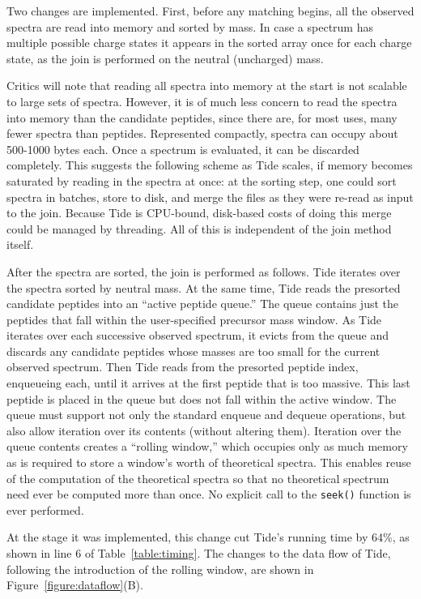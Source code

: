 Two changes are implemented. First, before any matching begins, all
the observed spectra are read into memory and sorted by mass.  In case
a spectrum has multiple possible charge states it appears in the
sorted array once for each charge state, as the join is performed on
the neutral (uncharged) mass.

Critics will note that reading all spectra into memory at the start is
not scalable to large sets of spectra. However, it is of much less
concern to read the spectra into memory than the candidate peptides,
since there are, for most uses, many fewer spectra than
peptides. Represented compactly, spectra can occupy about 500-1000
bytes each. Once a spectrum is evaluated, it can be discarded
completely. This suggests the following scheme as Tide scales, if
memory becomes saturated by reading in the spectra at once: at the
sorting step, one could sort spectra in batches, store to disk, and
merge the files as they were re-read as input to the join. Because Tide
is CPU-bound, disk-based costs of doing this merge could be managed by
threading. All of this is independent of the join method itself.

After the spectra are sorted, the join is performed as follows. Tide
iterates over the spectra sorted by neutral mass. At the same time,
Tide reads the presorted candidate peptides into an ``active peptide
queue.'' The queue contains just the peptides that fall within the
user-specified precursor mass window. As Tide iterates over each
successive observed spectrum, it evicts from the queue and discards
any candidate peptides whose masses are too small for the current observed
spectrum. Then Tide reads from the presorted peptide index, enqueueing
each, until it arrives at the first peptide that is too massive. This
last peptide is placed in the queue but does not fall within the
active window. The queue must support not only the standard enqueue
and dequeue operations, but also allow iteration over its contents
(without altering them). Iteration over the queue contents creates a
``rolling window,'' which occupies only as much memory as is required
to store a window's worth of theoretical spectra. This enables reuse
of the computation of the theoretical spectra so that no theoretical
spectrum need ever be computed more than once. No explicit call to the 
{\tt seek()} function
is ever performed.

At the stage it was implemented, this change cut Tide's running time
by 64\%, as shown in line 6 of Table~\ref{table:timing}. The changes
to the data flow of Tide, following the introduction of the rolling
window, are shown in Figure~\ref{figure:dataflow}(B).

